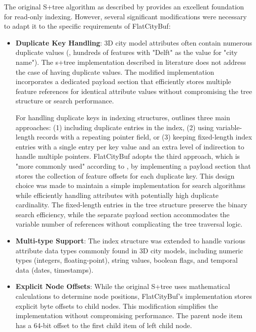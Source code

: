 The original S+tree algorithm as described by \citet{static_b_trees} provides an excellent foundation for read-only indexing. However, several significant modifications were necessary to adapt it to the specific requirements of FlatCityBuf:

\begin{itemize}
\item \textbf{Duplicate Key Handling}: 3D city model attributes often contain numerous duplicate values (\eg, hundreds of features with "Delft" as the value for "city name"). The \ac{s+tree} implementation described in literature \citep{static_b_trees} does not address the case of having duplicate values. The modified implementation incorporates a dedicated payload section that efficiently stores multiple feature references for identical attribute values without compromising the tree structure or search performance.

For handling duplicate keys in indexing structures, \citet{ramez_2015} outlines three main approaches: (1) including duplicate entries in the index, (2) using variable-length records with a repeating pointer field, or (3) keeping fixed-length index entries with a single entry per key value and an extra level of indirection to handle multiple pointers. FlatCityBuf adopts the third approach, which is "more commonly used" according to \citet{ramez_2015}, by implementing a payload section that stores the collection of feature offsets for each duplicate key. This design choice was made to maintain a simple implementation for search algorithms while efficiently handling attributes with potentially high duplicate cardinality. The fixed-length entries in the tree structure preserve the binary search efficiency, while the separate payload section accommodates the variable number of references without complicating the tree traversal logic.

\item \textbf{Multi-type Support}: The index structure was extended to handle various attribute data types commonly found in 3D city models, including numeric types (integers, floating-point), string values, boolean flags, and temporal data (dates, timestamps).

\item \textbf{Explicit Node Offsets}: While the original S+tree uses mathematical calculations to determine node positions, FlatCityBuf's implementation stores explicit byte offsets to child nodes.  This modification simplifies the implementation without compromising performance. The parent node item has a 64-bit offset to the first child item of left child node.


\end{itemize}
